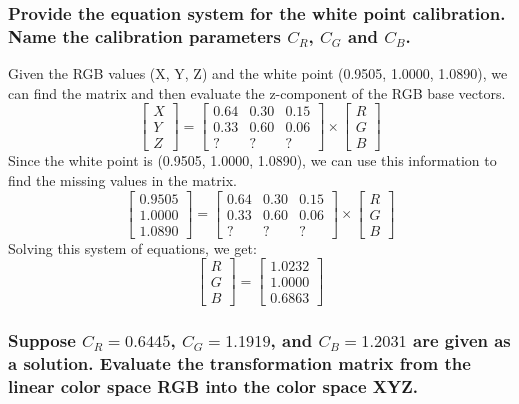 \documentclass{article}
\begin{document}
\subsubsection*{Provide the equation system for the white point calibration. Name the calibration parameters $C_R$, $C_G$ and $C_B$.}
Given the RGB values (X, Y, Z) and the white point (0.9505, 1.0000, 1.0890), we can find the matrix and then evaluate the z-component of the RGB base vectors.
\[
\begin{bmatrix} X \\ Y \\ Z \end{bmatrix} = \begin{bmatrix} 0.64 & 0.30 & 0.15 \\ 0.33 & 0.60 & 0.06 \\ \text{?} & \text{?} & \text{?} \end{bmatrix} \times \begin{bmatrix} R \\ G \\ B \end{bmatrix}
\]
Since the white point is (0.9505, 1.0000, 1.0890), we can use this information to find the missing values in the matrix.
\[
\begin{bmatrix} 0.9505 \\ 1.0000 \\ 1.0890 \end{bmatrix} = \begin{bmatrix} 0.64 & 0.30 & 0.15 \\ 0.33 & 0.60 & 0.06 \\ \text{?} & \text{?} & \text{?} \end{bmatrix} \times \begin{bmatrix} R \\ G \\ B \end{bmatrix}
\]
Solving this system of equations, we get:
\[
\begin{bmatrix} R \\ G \\ B \end{bmatrix} = \begin{bmatrix} 1.0232 \\ 1.0000 \\ 0.6863 \end{bmatrix}
\]

\subsubsection{Suppose $C_R = 0.6445$, $C_G = 1.1919$, and $C_B = 1.2031$ are given as a solution. Evaluate the transformation matrix from the linear color space RGB into the color space XYZ.}
\end{document}
